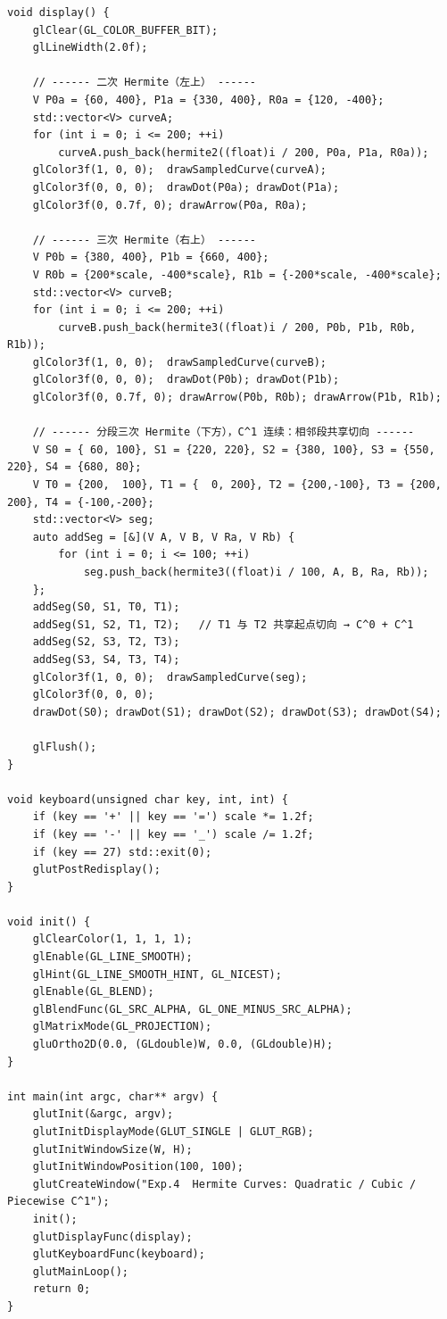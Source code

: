 \documentclass[a4paper,12pt]{ctexart}
\begin{document}
\begin{lstlisting}[style=cppstyle,caption={Hermite 曲线生成 —— 完整源代码}]
void display() {
    glClear(GL_COLOR_BUFFER_BIT);
    glLineWidth(2.0f);

    // ------ 二次 Hermite（左上） ------
    V P0a = {60, 400}, P1a = {330, 400}, R0a = {120, -400};
    std::vector<V> curveA;
    for (int i = 0; i <= 200; ++i)
        curveA.push_back(hermite2((float)i / 200, P0a, P1a, R0a));
    glColor3f(1, 0, 0);  drawSampledCurve(curveA);
    glColor3f(0, 0, 0);  drawDot(P0a); drawDot(P1a);
    glColor3f(0, 0.7f, 0); drawArrow(P0a, R0a);

    // ------ 三次 Hermite（右上） ------
    V P0b = {380, 400}, P1b = {660, 400};
    V R0b = {200*scale, -400*scale}, R1b = {-200*scale, -400*scale};
    std::vector<V> curveB;
    for (int i = 0; i <= 200; ++i)
        curveB.push_back(hermite3((float)i / 200, P0b, P1b, R0b, R1b));
    glColor3f(1, 0, 0);  drawSampledCurve(curveB);
    glColor3f(0, 0, 0);  drawDot(P0b); drawDot(P1b);
    glColor3f(0, 0.7f, 0); drawArrow(P0b, R0b); drawArrow(P1b, R1b);

    // ------ 分段三次 Hermite（下方），C^1 连续：相邻段共享切向 ------
    V S0 = { 60, 100}, S1 = {220, 220}, S2 = {380, 100}, S3 = {550, 220}, S4 = {680, 80};
    V T0 = {200,  100}, T1 = {  0, 200}, T2 = {200,-100}, T3 = {200, 200}, T4 = {-100,-200};
    std::vector<V> seg;
    auto addSeg = [&](V A, V B, V Ra, V Rb) {
        for (int i = 0; i <= 100; ++i)
            seg.push_back(hermite3((float)i / 100, A, B, Ra, Rb));
    };
    addSeg(S0, S1, T0, T1);
    addSeg(S1, S2, T1, T2);   // T1 与 T2 共享起点切向 → C^0 + C^1
    addSeg(S2, S3, T2, T3);
    addSeg(S3, S4, T3, T4);
    glColor3f(1, 0, 0);  drawSampledCurve(seg);
    glColor3f(0, 0, 0);
    drawDot(S0); drawDot(S1); drawDot(S2); drawDot(S3); drawDot(S4);

    glFlush();
}

void keyboard(unsigned char key, int, int) {
    if (key == '+' || key == '=') scale *= 1.2f;
    if (key == '-' || key == '_') scale /= 1.2f;
    if (key == 27) std::exit(0);
    glutPostRedisplay();
}

void init() {
    glClearColor(1, 1, 1, 1);
    glEnable(GL_LINE_SMOOTH);
    glHint(GL_LINE_SMOOTH_HINT, GL_NICEST);
    glEnable(GL_BLEND);
    glBlendFunc(GL_SRC_ALPHA, GL_ONE_MINUS_SRC_ALPHA);
    glMatrixMode(GL_PROJECTION);
    gluOrtho2D(0.0, (GLdouble)W, 0.0, (GLdouble)H);
}

int main(int argc, char** argv) {
    glutInit(&argc, argv);
    glutInitDisplayMode(GLUT_SINGLE | GLUT_RGB);
    glutInitWindowSize(W, H);
    glutInitWindowPosition(100, 100);
    glutCreateWindow("Exp.4  Hermite Curves: Quadratic / Cubic / Piecewise C^1");
    init();
    glutDisplayFunc(display);
    glutKeyboardFunc(keyboard);
    glutMainLoop();
    return 0;
}
\end{lstlisting}
\end{document}
